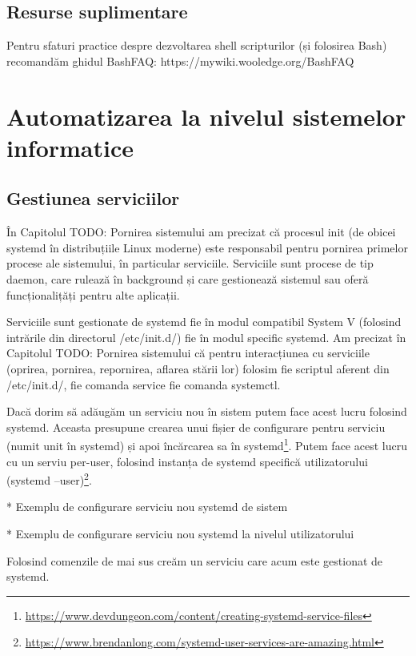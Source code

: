 \subsection{Resurse suplimentare}
\label{sec:script-advancedfunc-supl}

Pentru sfaturi practice despre dezvoltarea shell scripturilor (și folosirea
Bash) recomandăm ghidul BashFAQ: https://mywiki.wooledge.org/BashFAQ

\section{Automatizarea la nivelul sistemelor informatice}
\label{sec:script-infosys}

\subsection{Gestiunea serviciilor}
\label{sec:script-infosys-services}

În Capitolul TODO: Pornirea sistemului am precizat că procesul init (de obicei
systemd în distribuțiile Linux moderne) este responsabil pentru pornirea
primelor procese ale sistemului, în particular serviciile. Serviciile sunt
procese de tip daemon, care rulează în background și care gestionează sistemul
sau oferă funcționalițăți pentru alte aplicații.

Serviciile sunt gestionate de systemd fie în modul compatibil System V (folosind
intrările din directorul /etc/init.d/) fie în modul specific systemd. Am
precizat în Capitolul TODO: Pornirea sistemului că pentru interacțiunea cu
serviciile (oprirea, pornirea, repornirea, aflarea stării lor) folosim fie
scriptul aferent din /etc/init.d/, fie comanda service fie comanda systemctl.

Dacă dorim să adăugăm un serviciu nou în sistem putem face acest lucru folosind
systemd. Aceasta presupune crearea unui fișier de configurare pentru serviciu
(numit unit în systemd) și apoi încărcarea sa în
systemd\footnote{\url{https://www.devdungeon.com/content/creating-systemd-service-files}}.
Putem face acest lucru cu un serviu per-user, folosind instanța de systemd
specifică utilizatorului (systemd
--user)\footnote{\url{https://www.brendanlong.com/systemd-user-services-are-amazing.html}}.

* Exemplu de configurare serviciu nou systemd de sistem

* Exemplu de configurare serviciu nou systemd la nivelul utilizatorului

Folosind comenzile de mai sus creăm un serviciu care acum este gestionat de
systemd.

